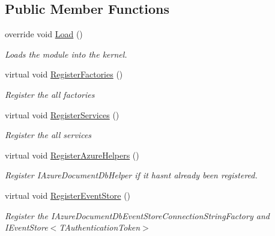\subsection*{Public Member Functions}
\begin{DoxyCompactItemize}
\item 
override void \hyperlink{classCqrs_1_1Ninject_1_1Azure_1_1DocumentDb_1_1Configuration_1_1AzureDocumentDbEventStoreModule_a5b131fff27bf3787fa762bd5dc364bdd_a5b131fff27bf3787fa762bd5dc364bdd}{Load} ()
\begin{DoxyCompactList}\small\item\em Loads the module into the kernel. \end{DoxyCompactList}\item 
virtual void \hyperlink{classCqrs_1_1Ninject_1_1Azure_1_1DocumentDb_1_1Configuration_1_1AzureDocumentDbEventStoreModule_a877c0ec79b109c14b0b6f950b643d9a8_a877c0ec79b109c14b0b6f950b643d9a8}{Register\+Factories} ()
\begin{DoxyCompactList}\small\item\em Register the all factories \end{DoxyCompactList}\item 
virtual void \hyperlink{classCqrs_1_1Ninject_1_1Azure_1_1DocumentDb_1_1Configuration_1_1AzureDocumentDbEventStoreModule_a31458027b78e7016206b0340f647bd97_a31458027b78e7016206b0340f647bd97}{Register\+Services} ()
\begin{DoxyCompactList}\small\item\em Register the all services \end{DoxyCompactList}\item 
virtual void \hyperlink{classCqrs_1_1Ninject_1_1Azure_1_1DocumentDb_1_1Configuration_1_1AzureDocumentDbEventStoreModule_a0e10f40d139dc9268f492d0c1497c598_a0e10f40d139dc9268f492d0c1497c598}{Register\+Azure\+Helpers} ()
\begin{DoxyCompactList}\small\item\em Register I\+Azure\+Document\+Db\+Helper if it hasn\textquotesingle{}t already been registered. \end{DoxyCompactList}\item 
virtual void \hyperlink{classCqrs_1_1Ninject_1_1Azure_1_1DocumentDb_1_1Configuration_1_1AzureDocumentDbEventStoreModule_a9aad9974c48acdbabb458117d7ab9e82_a9aad9974c48acdbabb458117d7ab9e82}{Register\+Event\+Store} ()
\begin{DoxyCompactList}\small\item\em Register the I\+Azure\+Document\+Db\+Event\+Store\+Connection\+String\+Factory and I\+Event\+Store$<$\+T\+Authentication\+Token$>$ \end{DoxyCompactList}\end{DoxyCompactItemize}


